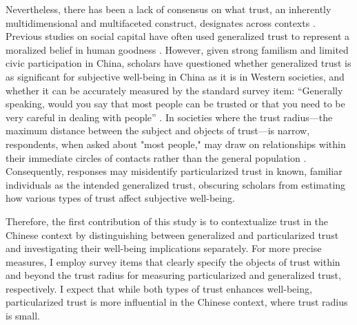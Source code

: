 Nevertheless, there has been a lack of consensus on what trust, an inherently multidimensional and multifaceted construct, designates across contexts \parencite{nannestadWhatHaveWe2008}. Previous studies on social capital have often used generalized trust to represent a moralized belief in human goodness \parencite{adedejiExaminingPathwaysGeneral2023,helliwellHowsLifeCombining2003,helliwellSocialContextWell2004}. However, given strong familism and limited civic participation in China, scholars have questioned whether generalized trust is as significant for subjective well-being in China as it is in Western societies, and whether it can be accurately measured by the standard survey item: “Generally speaking, would you say that most people can be trusted or that you need to be very careful in dealing with people” \parencite{delheyHowGeneralTrust2011,liParticularizedTrustGeneralized2002}. In societies where the trust radius—the maximum distance between the subject and objects of trust—is narrow, respondents, when asked about "most people," may draw on relationships within their immediate circles of contacts rather than the general population \parencite{liParticularizedTrustGeneralized2002}. Consequently, responses may misidentify particularized trust in known, familiar individuals as the intended generalized trust, obscuring scholars from estimating how various types of trust affect subjective well-being.

Therefore, the first contribution of this study is to contextualize trust in the Chinese context by distinguishing between generalized and particularized trust and investigating their well-being implications separately. For more precise measures, I employ survey items that clearly specify the objects of trust within and beyond the trust radius for measuring particularized and generalized trust, respectively. I expect that while both types of trust enhances well-being, particularized trust is more influential in the Chinese context, where trust radius is small.

